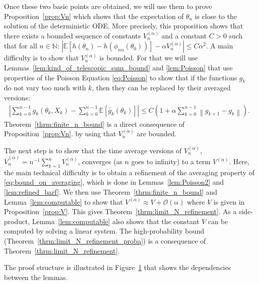 \documentclass{article}
\newcommand\N{\mathbb{N}}
\newcommand\E{\mathbb{E}}
\newcommand\esp[1]{\E\left[#1\right]}
\newcommand\abs[1]{\left|#1\right|}
\newcommand\norm[1]{\left\|#1\right\|}
\newcommand\toA{^{(\alpha)}}
\newcommand\bO[1]{\mathcal{O}(#1)}
\begin{document}
Once these two basic points are obtained, we will use them to prove Proposition~\ref{prop:Vn} which shows that the expectation of $\theta_n$ is close to the solution of the deterministic ODE. More precisely, this proposition shows that there exists a bounded sequence of constants $V\toA_n$ and a constant $C>0$ such that for all $n\in \N$:
    $\abs{\esp{h(\theta_n) - h(\phi_{n\alpha}(\theta_0))}- \alpha V\toA_n} \le C\alpha^2$. 
A main difficulty is to show that $V\toA_n$ is bounded. For that we will use Lemmas~\ref{lem:kind_of_telescopic_sum_bound} and \ref{lem:Poisson} that use properties of the Poisson Equation \eqref{eq:Poisson} to show that if the functions $g_k$ do not vary too much with $k$, then they can be replaced by their averaged versions: 
\begin{align}
    \label{eq:bound_on_averaging}
    \abs{\sum_{k=0}^{n-1} g_k(\theta_k,X_k) - \sum_{k=0}^{n-1}\esp{\bar{g}_k(\theta_k)}} \le C(1+ \alpha\sum_{k=0}^{n-1}\norm{g_{k+1}-g_k}).
\end{align}
Theorem~\ref{thrm:finite_n_bound} is a direct consequence of Proposition~\ref{prop:Vn}.  by using that $V\toA_n$ are bounded. 

The next step is to show that the time average versions of $V\toA_n$, $\overline{V}\toA_n=n^{-1}\sum_{k=1}^nV\toA_n$, converges (as $n$ goes to infinity) to a term $V\toA$. Here, the main technical difficulty is to obtain a refinement of the averaging property of \eqref{eq:bound_on_averaging}, which is done in Lemmas~\ref{lem:Poisson2} and \ref{lem:refined_barf}. We then use Theorem~\ref{thrm:finite_n_bound} and Lemma~\ref{lem:computable} to show that $V\toA\approx V+\bO{\alpha}$ where $V$ is given in Proposition~\ref{prop:V}. This gives Theorem~\ref{thrm:limit_N_refinement}. As a side-product, Lemma~\ref{lem:computable} also shows that the constant $V$ can be computed by solving a linear system.  The high-probability bound (Theorem~\ref{thrm:limit_N_refinement_proba}) is a consequence of Theorem~\ref{thrm:limit_N_refinement}.


The proof structure is illustrated in Figure~\ref{fig:proof_overview} that shows the dependencies between the lemmas.

\begin{figure}[omitted: a diagram of this paper's results, not reproduced here]\label{fig:proof_overview}\end{figure}
\end{document}
